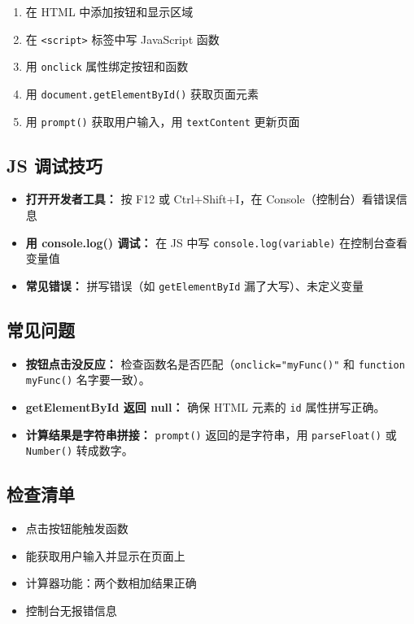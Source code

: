 \documentclass[a4paper,12pt]{ctexart}
\begin{document}
\begin{enumerate}
  \item 在 HTML 中添加按钮和显示区域
  \item 在 \texttt{<script>} 标签中写 JavaScript 函数
  \item 用 \texttt{onclick} 属性绑定按钮和函数
  \item 用 \texttt{document.getElementById()} 获取页面元素
  \item 用 \texttt{prompt()} 获取用户输入，用 \texttt{textContent} 更新页面
\end{enumerate}

\subsection*{JS 调试技巧}

\begin{itemize}
  \item \textbf{打开开发者工具：} 按 F12 或 Ctrl+Shift+I，在 Console（控制台）看错误信息
  \item \textbf{用 console.log() 调试：} 在 JS 中写 \texttt{console.log(variable)} 在控制台查看变量值
  \item \textbf{常见错误：} 拼写错误（如 \texttt{getElementById} 漏了大写）、未定义变量
\end{itemize}

\subsection*{常见问题}

\begin{itemize}
  \item \textbf{按钮点击没反应：} 检查函数名是否匹配（\texttt{onclick="myFunc()"} 和 \texttt{function myFunc()} 名字要一致）。
  \item \textbf{getElementById 返回 null：} 确保 HTML 元素的 \texttt{id} 属性拼写正确。
  \item \textbf{计算结果是字符串拼接：} \texttt{prompt()} 返回的是字符串，用 \texttt{parseFloat()} 或 \texttt{Number()} 转成数字。
\end{itemize}

\subsection*{检查清单}

\begin{itemize}
  \item 点击按钮能触发函数
  \item 能获取用户输入并显示在页面上
  \item 计算器功能：两个数相加结果正确
  \item 控制台无报错信息
\end{itemize}
\end{document}
